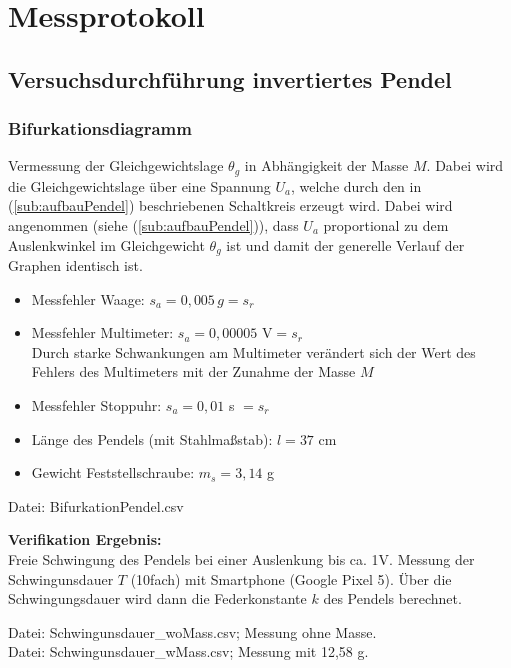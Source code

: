 

\chapter{Messprotokoll}
\label{chap:protokoll}


\section{Versuchsdurchführung invertiertes Pendel}
\label{sec:versuchPendel}
\subsection*{Bifurkationsdiagramm}
\label{sub:bifu}
Vermessung der Gleichgewichtslage $\theta_g$ in Abhängigkeit der Masse $M$. Dabei wird die Gleichgewichtslage über eine Spannung $U_a$, welche durch den in (\ref{sub:aufbauPendel}) beschriebenen Schaltkreis erzeugt wird. Dabei wird angenommen (siehe (\ref{sub:aufbauPendel})), dass $U_a$ proportional zu dem Auslenkwinkel im Gleichgewicht $\theta_g$ ist und damit der generelle Verlauf der Graphen identisch ist.
\begin{itemize}
\item Messfehler Waage: $s_a = 0,005\, g = s_r$
\item Messfehler Multimeter: $s_a = 0,00005$ V$= s_r$\\
      Durch starke Schwankungen am Multimeter verändert sich der Wert des Fehlers des Multimeters mit der Zunahme der Masse $M$
\item Messfehler Stoppuhr: $s_a = 0,01$ s $=s_r$
\item Länge des Pendels (mit Stahlmaßstab): $l = 37$ cm
\item Gewicht Feststellschraube: $m_s = 3,14$ g
\end{itemize}
Datei: BifurkationPendel.csv

\textbf{Verifikation Ergebnis:}\\
Freie Schwingung des Pendels bei einer Auslenkung bis ca. 1V. Messung der Schwingunsdauer $T$ (10fach) mit Smartphone (Google Pixel 5). Über die Schwingungsdauer wird dann die Federkonstante $k$ des Pendels berechnet.

Datei: Schwingunsdauer\_woMass.csv; Messung ohne Masse.\\
Datei: Schwingunsdauer\_wMass.csv; Messung mit 12,58 g.

